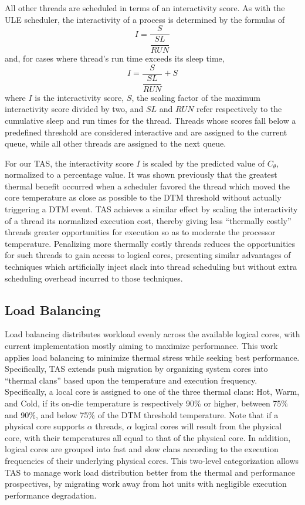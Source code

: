 \documentclass[times, 10pt,twocolumn]{IEEEtran}
\begin{document}
All other threads are scheduled in terms of an interactivity score.  As
with the ULE scheduler, the interactivity of a process is
determined by the formulas of
\begin{equation}
  \label{eq:interactsleeprun} 
I = \dfrac{S}{\dfrac{SL}{RUN}}
\end{equation} 
and, for cases where thread's run time exceeds its sleep
time,
\begin{equation}
  \label{eq:interactrunsleep} I = \dfrac{S}{\dfrac{SL}{RUN}}+S
\end{equation} 
where $I$ is the interactivity score, $S$, the scaling factor of the
maximum interactivity score divided by two, and $SL$ and $RUN$ refer
respectively to the cumulative sleep and run times for the thread.   
Threads whose scores fall below a predefined threshold are considered
interactive and are assigned to the current queue, while all other
threads are assigned to the next queue.

For our TAS, the interactivity score $I$ is scaled by the predicted
value of $C_{\theta}$, normalized to a percentage value.  It was shown
previously \cite{Zhou2010b} that the greatest thermal benefit occurred
when a scheduler favored the thread which moved the core temperature as
close as possible to the DTM threshold without actually triggering a DTM
event.  TAS achieves a similar effect by scaling the interactivity of a
thread its normalized execution cost, thereby giving less ``thermally
costly'' threads greater opportunities for execution so as to moderate
the processor temperature.  Penalizing more thermally costly threads
reduces the opportunities for such threads to gain access to logical
cores, presenting similar advantages of techniques which artificially
inject slack into thread scheduling but without extra scheduling
overhead incurred to those techniques.

\subsection{Load Balancing}
\label{sec:loadbalance} 
Load balancing distributes workload evenly across the available logical
cores, with current implementation mostly aiming to maximize
performance.  This work applies load balancing to minimize thermal
stress while seeking best performance.  Specifically, TAS extends push
migration by organizing system cores into ``thermal clans'' based upon
the temperature and execution frequency.  Specifically, a local core is
assigned to one of the three thermal clans: Hot, Warm, and Cold, if its
on-die temperature is respectively 90\% or higher, between 75\% and
90\%, and below 75\% of the DTM threshold temperature.  Note that if a
physical core supports $\alpha$ threads, $\alpha$ logical cores will
result from the physical core, with their temperatures all equal to that
of the physical core.  In addition, logical cores are grouped into fast
and slow clans according to the execution frequencies of their
underlying physical cores.  This two-level categorization allows TAS to
manage work load distribution better from the thermal and performance
prospectives, by migrating work away from hot units with negligible
execution performance degradation.
\end{document}

